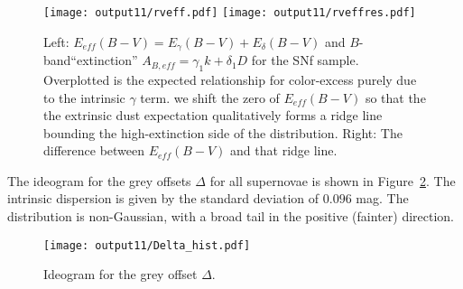 \documentclass{aastex}   	%
\begin{document}
\begin{figure}[htbp] %
   \centering
   \texttt{[image: output11/rveff.pdf]}
   \texttt{[image: output11/rveffres.pdf]}
   \caption{Left: $E_{eff}(B-V) = E_\gamma(B-V) + E_\delta(B-V)$ and $B$-band``extinction''
$A_{B, eff} = \gamma_1 k + \delta_1D$ for the SNf sample.  Overplotted is the expected relationship for color-excess
purely due to the intrinsic $\gamma$ term.  we shift the zero of  $E_{eff}(B-V)$  so that the  the extrinsic dust expectation qualitatively forms a ridge line
bounding the high-extinction side of the distribution.
Right: The difference between $E_{eff}(B-V)$ and that ridge line.
   \label{rveff:fig}}
\end{figure}


The ideogram for the grey offsets $\Delta$ for all supernovae is shown in Figure~\ref{hist:fig}.  The intrinsic dispersion
is given by the standard deviation of $0.096$ mag.  The distribution is non-Gaussian, with a broad tail in the positive (fainter) direction.
\begin{figure}[htbp] %
   \centering
   \texttt{[image: output11/Delta\_hist.pdf]} 
   \caption{Ideogram for the grey offset $\Delta$.
   \label{hist:fig}}
\end{figure}
\end{document}
